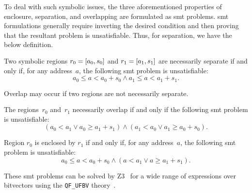 To deal with such symbolic issues,
the three aforementioned properties of enclosure, separation, and overlapping
are formulated as \ac{smt} problems.
\Ac{smt} formulations generally require inverting the desired condition
and then proving that the resultant problem is unsatisfiable.
Thus, for separation, we have the below definition.
\begin{definition}
  Two symbolic regions $r_0=[a_0,s_0]$ and $r_1=[a_1,s_1]$
  are necessarily separate if and only if, for any address~$a$,
  the following \ac{smt} problem is unsatisfiable:
  \begin{equation*}
  a_0\leq a<a_0+s_0\wedge a_1\leq a<a_1+s_1.
  \end{equation*}
\end{definition}
Overlap may occur if two regions are not necessarily separate.
\begin{definition}
  The regions~$r_0$ and~$r_1$ necessarily overlap if and only if
  the following \ac{smt} problem is unsatisfiable:
  \begin{equation*}
  (a_0<a_1\vee a_0\geq a_1+s_1)\wedge(a_1<a_0\vee a_1\geq a_0+s_0).
  \end{equation*}
\end{definition}
\begin{definition}
  Region $r_0$ is enclosed by $r_1$ if and only if,
  for any address~$a$, the following \ac{smt} problem is unsatisfiable:
  \begin{equation*}
  a_0\leq a<a_0+s_0\wedge(a<a_1\vee a \geq a_1 + s_1).
  \end{equation*}
\end{definition}
These \ac{smt} problems can be solved by Z3~\citep{de2008z3}
for a wide range of expressions over bitvectors
using the \texttt{QF\_UFBV} theory~\citep{barrett2017smt}.

